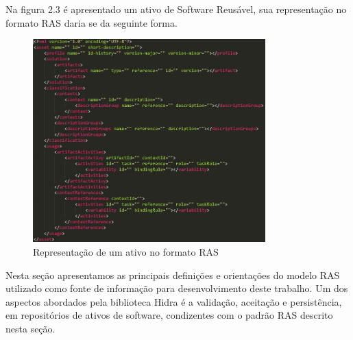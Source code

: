     Na figura 2.3 é apresentado um ativo de Software Reusável, sua representação no formato RAS daria se da seguinte forma.
    

\begin{figure}[H]
\includegraphics[width=0.8\textwidth]{images/ativoSemParametros}
\centering
\caption{ Representação de um ativo no formato RAS}
\label{Rotulo}
\end{figure}

    
    

    Nesta seção apresentamos as principais definições e orientações do modelo RAS utilizado como fonte de informação para desenvolvimento deste trabalho. Um dos aspectos abordados pela biblioteca Hidra é a validação, aceitação e persistência, em repositórios de ativos de software, condizentes com o padrão RAS descrito nesta seção.




